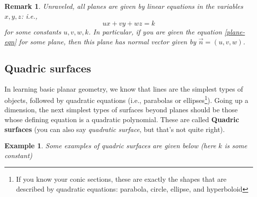 \documentclass[12pt]{article}
\numberwithin{equation}{subsection}
\numberwithin{figure}{subsection}
\theoremstyle{note}
\newtheorem{example}[subsection]{Example}
\newtheorem{remark}[subsection]{Remark}
\begin{document}
{\begin{remark} Unraveled, all planes are given by \textit{linear} equations in the variables $x,y,z$: i.e., \begin{equation} \label{plane-eqn} u x+v y+w z=k \end{equation} for some constants $u,v,w,k$. In particular, if you are given the equation \eqref{plane-eqn} for some plane, then this plane has normal vector given by $\vec{n}=(u,v,w)$.\end{remark}

\subsection{Quadric surfaces}
In learning basic planar geometry, we know that lines are the simplest types of objects, followed by quadratic equations (i.e., parabolas or ellipses\footnote{If you know your conic sections, these are exactly the shapes that are described by quadratic equations: parabola, circle, ellipse, and hyperboloid}). Going up a dimension, the next simplest types of surfaces beyond planes should be those whose defining equation is a quadratic polynomial. These are called \textbf{Quadric surfaces} (you can also say \textit{quadratic surface}, but that's not quite right). 

\begin{example}Some examples of quadric surfaces are given below (here $k$ is some constant)


\end{example}}
\end{document}
